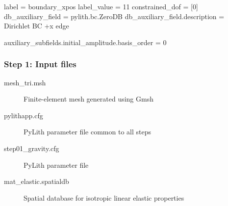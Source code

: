 \documentclass[aspectratio=169]{beamer}
\begin{document}
\begin{frame}[t,fragile]
\begin{minipage}[t]{0.67\textwidth}
\begin{onlyenv}
\begin{cfgcode}
        label = boundary_xpos
        label_value = 11
        constrained_dof = [0]
        db_auxiliary_field = pylith.bc.ZeroDB
        db_auxiliary_field.description = Dirichlet BC +x edge

        auxiliary_subfields.initial_amplitude.basis_order = 0 
      \end{cfgcode}
    \end{onlyenv}
  \end{minipage}

  
\end{frame}


\begin{frame}
  \frametitle{Step 1: Input files}
  \summary{}

  \begin{description}
  \item[mesh\_tri.msh] Finite-element mesh generated using Gmsh
  \item[pylithapp.cfg] PyLith parameter file common to all steps
  \item[step01\_gravity.cfg] PyLith parameter file
  \item[mat\_elastic.spatialdb] Spatial database for isotropic linear elastic properties
  \end{description}
    
\end{frame}
\end{document}
